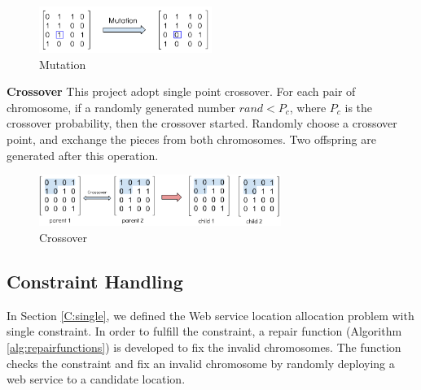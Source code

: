 \begin{figure}[!ht]
\centering
	\includegraphics[width=0.5\textwidth]{pics/mutation.png}
\caption{Mutation}
\label{graph1}
\end{figure}

\begin{flushleft}\textbf{Crossover} This project adopt single point crossover. For each pair of chromosome, if a randomly generated number $rand < P_c$, where
$P_c$ is the crossover probability, then the crossover started.  Randomly choose a crossover point, and exchange the pieces from both chromosomes. Two offspring
are generated after this operation.
\end{flushleft}
                                   

\begin{figure}[!ht]
\centering
  \includegraphics[width=0.7\textwidth]{pics/crossover.png}
\caption{Crossover}
\label{graph2}
\end{figure}

\subsection{Constraint Handling}
In Section \ref{C:single}, we defined the Web service location allocation problem with single constraint. In order to fulfill the constraint,
a repair function (Algorithm \ref{alg:repairfunctions}) is developed to fix the invalid chromosomes. 
The function checks the constraint and fix an invalid chromosome by randomly deploying a web service to a candidate location.




